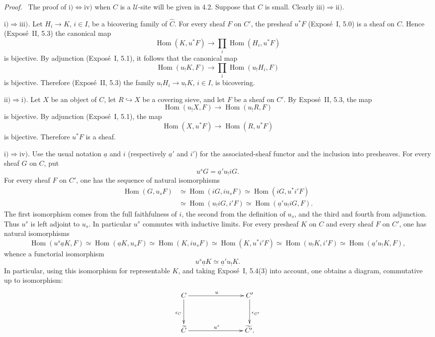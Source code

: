 \documentclass[11pt]{article}
\newcommand{\U}{\mathcal{U}}
\newcommand{\Hom}{\operatorname{Hom}}
\newenvironment{prooftext}{\par\noindent\emph{Proof.}\ }{\par\medskip}
\begin{document}
\begin{prooftext}
The proof of \(\mathrm{i)}\Leftrightarrow\mathrm{iv)}\) when \(C\) is a \(\U\)-site will be given in 4.2. Suppose that \(C\) is small. Clearly \(\mathrm{iii)}\Rightarrow\mathrm{ii)}\).

\emph{\(\mathrm{i)}\Rightarrow\mathrm{iii)}\).} Let \(H_i\to K\), \(i\in I\), be a bicov\-ering family of \(\widehat C\). For every sheaf \(F\) on \(C'\), the presheaf \(u^{\ast}F\) (Expos\'e~I, 5.0) is a sheaf on \(C\). Hence (Expos\'e~II, 5.3) the canonical map
\[
\Hom(K,u^{\ast}F)\longrightarrow \prod_i\Hom(H_i,u^{\ast}F)
\]
is bijective. By adjunction (Expos\'e~I, 5.1), it follows that the canonical map
\[
\Hom(u_!K,F)\longrightarrow \prod_i\Hom(u_!H_i,F)
\]
is bijective. Therefore (Expos\'e~II, 5.3) the family \(u_!H_i\to u_!K\), \(i\in I\), is bicov\-ering.

\emph{\(\mathrm{ii)}\Rightarrow\mathrm{i)}\).} Let \(X\) be an object of \(C\), let \(R\hookrightarrow X\) be a covering sieve, and let \(F\) be a sheaf on \(C'\). By Expos\'e~II, 5.3, the map
\[
\Hom(u_!X,F)\longrightarrow \Hom(u_!R,F)
\]
is bijective. By adjunction (Expos\'e~I, 5.1), the map
\[
\Hom(X,u^{\ast}F)\longrightarrow \Hom(R,u^{\ast}F)
\]
is bijective. Therefore \(u^{\ast}F\) is a sheaf.

\emph{\(\mathrm{i)}\Rightarrow\mathrm{iv)}\).} Use the usual notation \(\underline a\) and \(i\) (respectively \(\underline a'\) and \(i'\)) for the associated-sheaf functor and the inclusion into presheaves. For every sheaf \(G\) on \(C\), put
\[
u^sG=\underline a' u_! iG.
\]
For every sheaf \(F\) on \(C'\), one has the sequence of natural isomorphisms
\begin{align*}
\Hom(G,u_sF)&\simeq \Hom(iG,iu_sF)\simeq \Hom(iG,u^{\ast}i'F)\\
&\simeq \Hom(u_!iG,i'F)\simeq \Hom(\underline a'u_!iG,F).
\end{align*}
The first isomorphism comes from the full faithfulness of \(i\), the second from the definition of \(u_s\), and the third and fourth from adjunction. Thus \(u^s\) is left adjoint to \(u_s\). In particular \(u^s\) commutes with inductive limits. For every presheaf \(K\) on \(C\) and every sheaf \(F\) on \(C'\), one has natural isomorphisms
\[
\Hom(u^s\underline a K,F)\simeq \Hom(\underline a K,u_sF)\simeq \Hom(K,iu_sF)\simeq \Hom(K,u^{\ast}i'F)\simeq \Hom(u_!K,i'F)\simeq \Hom(\underline a'u_!K,F),
\]
whence a functorial isomorphism
\[
u^s\underline a K\simeq \underline a'u_!K.
\]
In particular, using this isomorphism for representable \(K\), and taking Expos\'e~I, 5.4(3) into account, one obtains a diagram, commutative up to isomorphism:
\[
\xymatrix@C=2.75cm@R=1.25cm{
C \ar[d]_{\epsilon_C}\ar[r]^{u}& C'\ar[d]^{\epsilon_{C'}}\\
\widetilde C \ar[r]^{u^s}& \widetilde{C'} .
}
\]


\end{prooftext}
\end{document}
